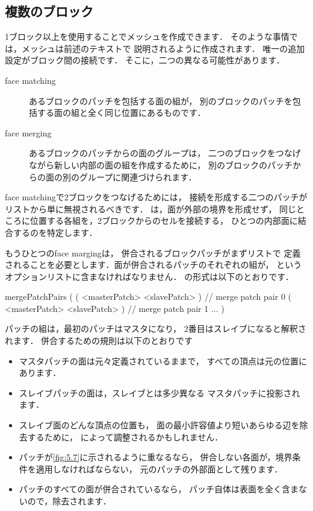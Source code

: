 \subsection{複数のブロック}
\label{ssec:5.3.2}
1ブロック以上を使用することでメッシュを作成できます．
そのような事情では，メッシュは前述のテキストで
説明されるように作成されます．
唯一の追加設定がブロック間の接続です．
そこに，二つの異なる可能性があります．
\begin{description}
 \item[face matching]
            あるブロックのパッチを包括する面の組が，
            別のブロックのパッチを包括する面の組と全く同じ位置にあるものです．
 \item[face merging]
            あるブロックのパッチからの面のグループは，
            二つのブロックをつなげながら新しい内部の面の組を作成するために，
            別のブロックのパッチからの面の別のグループに関連づけられます．
\end{description}
face matchingで2ブロックをつなげるためには，
接続を形成する二つのパッチが
リストから単に無視されるべきです．
は，面が外部の境界を形成せず，
同じところに位置する各組を，2ブロックからのセルを接続する，
ひとつの内部面に結合するのを特定します．

もうひとつのface margingは，
併合されるブロックパッチがまずリストで
定義されることを必要とします．面が併合されるパッチのそれぞれの組が，
というオプションリストに含まなければなりません．
の形式は以下のとおりです．
\begin{OFverbatim}[file]
mergePatchPairs
(
    ( <masterPatch> <slavePatch> ) // merge patch pair 0
    ( <masterPatch> <slavePatch> ) // merge patch pair 1
    ...
)
\end{OFverbatim}
パッチの組は，最初のパッチはマスタになり，
2番目はスレイブになると解釈されます．
併合するための規則は以下のとおりです
\begin{itemize}
 \item マスタパッチの面は元々定義されているままで，
       すべての頂点は元の位置にあります．
 \item スレイブパッチの面は，スレイブとは多少異なる
       マスタパッチに投影されます．
 \item スレイブ面のどんな頂点の位置も，
       面の最小許容値より短いあらゆる辺を除去するために，
       によって調整されるかもしれません．
 \item パッチが\autoref{fig:5.7}に示されるように重なるなら，
       併合しない各面が，境界条件を適用しなければならない，
       元のパッチの外部面として残ります．
 \item パッチのすべての面が併合されているなら，
       パッチ自体は表面を全く含まないので，除去されます．
\end{itemize}


